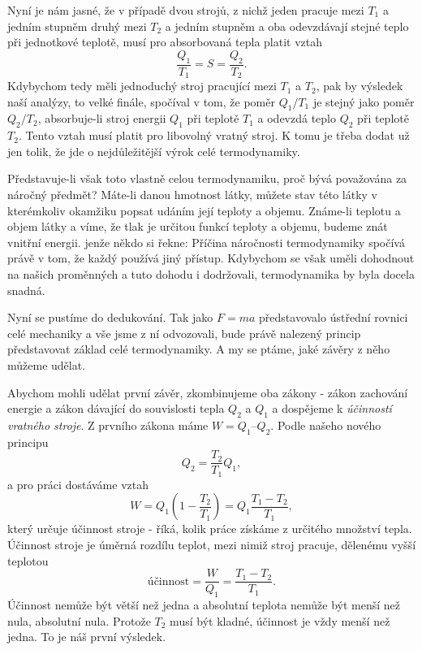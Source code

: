     Nyní je nám jasné, že v případě dvou strojů, z nichž jeden pracuje mezi \(T_1\) a jedním stupněm
    druhý mezi \(T_2\) a jedním stupněm a oba odevzdávají stejné teplo při jednotkové teplotě, musí
    pro absorbovaná tepla platit vztah
    \begin{equation}\label{fyz:eq701}
      \frac{Q_1}{T_1} = S = \frac{Q_2}{T_2}. 
    \end{equation}
    Kdybychom tedy měli jednoduchý stroj pracující mezi \(T_1\) a \(T_2\), pak by výsledek naší
    analýzy, to velké ﬁnále, spočíval v tom, že poměr \(Q_1/T_1\) je stejný jako poměr \(Q_2/T_2\),
    absorbuje-li stroj energii \(Q_1\) při teplotě \(T_1\) a odevzdá teplo \(Q_2\) při teplotě
    \(T_2\). Tento vztah musí platit pro libovolný vratný stroj. K tomu je třeba dodat už jen tolik,
    že jde o nejdůležitější výrok celé termodynamiky.

    Představuje-li však toto vlastně celou termodynamiku, proč bývá považována za náročný předmět?
    Máte-li danou hmotnost látky, můžete stav této látky v kterémkoliv okamžiku popsat udáním její
    teploty a objemu. Známe-li teplotu a objem látky a víme, že tlak je určitou funkcí teploty a
    objemu, budeme znát vnitřní energii. jenže někdo si řekne:  Příčina náročnosti
    termodynamiky spočívá právě v tom, že každý používá jiný přístup. Kdybychom se však uměli
    dohodnout na našich proměnných a tuto dohodu i dodržovali, termodynamika by byla docela snadná.

    Nyní se pustíme do dedukování. Tak jako \(F = ma\) představovalo ústřední rovnici celé mechaniky
    a vše jsme z ní odvozovali, bude právě nalezený princip představovat základ celé termodynamiky.
    A my se ptáme, jaké závěry z něho můžeme udělat.

    Abychom mohli udělat první závěr, zkombinujeme oba zákony - zákon zachování energie a zákon
    dávající do souvislosti tepla \(Q_2\) a \(Q_1\) a dospějeme k \emph{účinností vratného stroje}.
    Z prvního zákona máme \(W= Q_1 – Q_2\). Podle našeho nového principu
    \begin{equation*}
      Q_2=\frac{T_2}{T_1}Q_1,
    \end{equation*}
    a pro práci dostáváme vztah
    \begin{equation}\label{fyz:eq702}
      W=Q_1\left(1−\frac{T_2}{T_1}\right)=Q_1\frac{T_1−T_2}{T_1},
    \end{equation}   
    který určuje účinnost stroje - říká, kolik práce získáme z určitého množství tepla. Účinnost
    stroje je úměrná rozdílu teplot, mezi nimiž stroj pracuje, dělenému vyšší teplotou
    \begin{equation}\label{fyz:eq703}
      \text{účinnost} = \frac{W}{Q_1}=\frac{T_1−T_2}{T_1}.
    \end{equation} 
    Účinnost nemůže být větší než jedna a absolutní teplota nemůže být menší než nula, absolutní
    nula. Protože \(T_2\) musí být kladné, účinnost je vždy menší než jedna. To je náš první
    výsledek.

